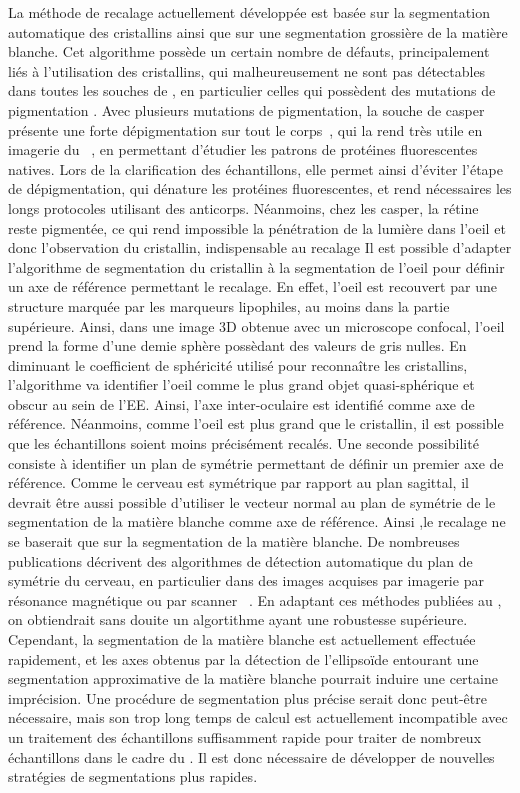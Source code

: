 \documentclass[\main/main.tex]{subfiles}
\begin{document}
%   
La méthode de recalage actuellement développée est basée sur la segmentation automatique des cristallins ainsi que sur une segmentation grossière de la matière blanche. Cet algorithme possède un certain nombre de défauts, principalement liés à l'utilisation des cristallins, qui malheureusement ne sont pas détectables dans toutes les souches de \pz{}, en particulier celles qui possèdent des mutations de pigmentation .
%
Avec plusieurs mutations de pigmentation, la souche de \pz{} casper présente une forte dépigmentation sur tout le corps~\cite{white_2008}, qui la rend très utile en imagerie du \pz~\cite{hecker_2020,camiolo_2020, wertman_2020}, en permettant d'étudier les patrons de protéines fluorescentes natives. Lors de la clarification des échantillons, elle permet ainsi d'éviter  l'étape de dépigmentation, qui dénature les protéines fluorescentes, et rend  nécessaires les longs protocoles utilisant des anticorps.   Néanmoins, chez les casper, la rétine reste pigmentée, ce qui rend impossible la pénétration de la lumière dans l'oeil et donc l'observation du cristallin, indispensable au recalage
%
Il est possible d'adapter l'algorithme de segmentation du cristallin à la segmentation de l'oeil pour définir un axe de référence permettant le recalage. En effet, l'oeil est recouvert par une structure marquée par les marqueurs lipophiles, au moins dans la partie supérieure. Ainsi, dans une image 3D obtenue avec un microscope confocal, l'oeil prend la forme d'une demie sphère possèdant des valeurs de gris nulles. En diminuant le coefficient de sphéricité utilisé  pour reconnaître les cristallins, l'algorithme va identifier l'oeil comme le plus grand objet quasi-sphérique et obscur au sein de l'EE.
Ainsi, l'axe inter-oculaire est identifié comme axe de référence. Néanmoins, comme l'oeil est plus grand que le cristallin, il est possible que les échantillons soient moins précisément recalés.
%
Une seconde possibilité consiste à identifier un plan de symétrie permettant de définir un premier axe de référence.
%
Comme le cerveau est symétrique par rapport au plan sagittal, il devrait être aussi possible d'utiliser le vecteur normal au plan de symétrie de le segmentation de la matière blanche comme axe de référence. Ainsi ,le recalage ne se baserait que sur la segmentation de la matière blanche.
%
De nombreuses publications décrivent des algorithmes de détection automatique du plan de symétrie du cerveau, en particulier dans des images acquises par imagerie par résonance magnétique ou par scanner ~\cite{tan_2019,noori_2020,rehman_2018}. En adaptant ces méthodes publiées au \pz{}, on obtiendrait sans douite un algortithme ayant une robustesse supérieure.
%
Cependant, la segmentation de la matière blanche est actuellement effectuée  rapidement, et les axes obtenus par la détection de l'ellipsoïde entourant une segmentation approximative de la matière blanche pourrait induire une certaine imprécision. Une procédure de segmentation plus précise serait donc peut-être nécessaire, mais son trop long temps de calcul est actuellement incompatible avec un traitement des échantillons suffisamment rapide pour traiter de nombreux échantillons dans le cadre du \hcs{}.
Il est donc nécessaire de développer de nouvelles stratégies de segmentations plus rapides.
\end{document}
